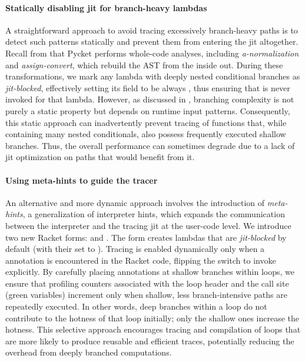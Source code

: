     \paragraph{Statically disabling \gls{jit} for branch-heavy lambdas}%
      A straightforward approach to avoid tracing excessively branch-heavy paths is to detect such patterns statically and prevent them from entering the \gls{jit} altogether. Recall from  that Pycket performs whole-code analyses, including \emph{a-normalization} and \emph{assign-convert}, which rebuild the AST from the inside out. During these transformations, we mark any lambda with deeply nested conditional branches as \emph{jit-blocked}, effectively setting its  field to be always , thus ensuring that  is never invoked for that lambda. However, as discussed in , branching complexity is not purely a static property but depends on runtime input patterns. Consequently, this static approach can inadvertently prevent tracing of functions that, while containing many nested conditionals, also possess frequently executed shallow branches. Thus, the overall performance can sometimes degrade due to a lack of \gls{jit} optimization on paths that would benefit from it.

    \paragraph{Using meta-hints to guide the tracer}%
      An alternative and more dynamic approach involves the introduction of \emph{meta-hints}, a generalization of interpreter hints, which expands the communication between the interpreter and the tracing \gls{jit} at the user-code level. We introduce two new Racket forms:  and . The form  creates lambdas that are \emph{jit-blocked} by default (with their  set to ). Tracing is enabled dynamically only when a  annotation is encountered in the Racket code, flipping the switch to invoke  explicitly. By carefully placing  annotations at shallow branches within loops, we ensure that profiling counters associated with the loop header and the call site (green variables) increment only when shallow, less branch-intensive paths are repeatedly executed. In other words, deep branches within a loop do not contribute to the hotness of that loop initially; only the shallow ones increase the hotness. This selective approach encourages tracing and compilation of loops that are more likely to produce reusable and efficient traces, potentially reducing the overhead from deeply branched computations.

